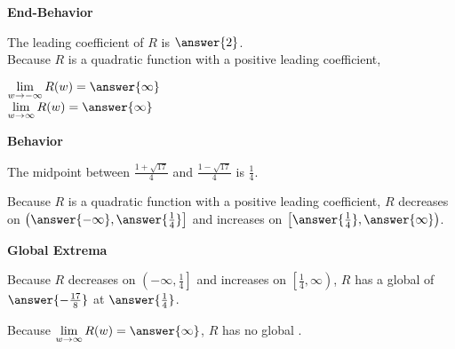 \documentclass{ximera}
\begin{document}
\begin{exercise}
\begin{question}  \textbf{\textcolor{blue!55!black}{End-Behavior}}


The leading coefficient of $R$ is $\answer{2}$. \\


Because $R$ is a quadratic function with a positive leading coefficient,

$\lim\limits_{w \to -\infty} R(w) = \answer{\infty}$ \\


$\lim\limits_{w \to \infty} R(w) = \answer{\infty}$ \\

\end{question}




\begin{question}  \textbf{\textcolor{blue!55!black}{Behavior}}


The midpoint between $\frac{1 + \sqrt{17}}{4} $ and $\frac{1 - \sqrt{17}}{4}$ is $\frac{1}{4}$.



Because $R$ is a quadratic function with a positive leading coefficient, $R$ decreases on $\left( \answer{-\infty}, \answer{\frac{1}{4}} \right]$ and increases on $\left[ \answer{\frac{1}{4}}, \answer{\infty} \right)$. 

\end{question}









\begin{question}  \textbf{\textcolor{blue!55!black}{Global Extrema}}

Because $R$ decreases on $\left( -\infty, \frac{1}{4} \right]$ and increases on $\left[ \frac{1}{4}, \infty \right)$, $R$ has a global   of $\answer{-\frac{17}{8}}$ at $\answer{\frac{1}{4}}$.



Because $\lim\limits_{w \to \infty} R(w) = \answer{\infty}$, $R$ has no global .

\end{question}













\end{exercise}
\end{document}
